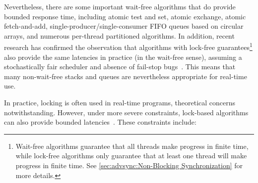 Nevertheless, there are some important wait-free algorithms that do
provide bounded response time, including atomic test and set,
atomic exchange,
atomic fetch-and-add,
single-producer/single-consumer FIFO queues based on circular arrays,
and numerous per-thread partitioned algorithms.
In addition, recent research has confirmed the observation that
algorithms with lock-free guarantees\footnote{
	Wait-free algorithms guarantee that all threads make progress in
	finite time, while lock-free algorithms only guarantee that at
	least one thread will make progress in finite time.
	See \cref{sec:advsync:Non-Blocking Synchronization} for more details.}
also provide the same latencies in practice (in the wait-free sense),
assuming a stochastically fair scheduler and absence of fail-stop
bugs~\cite{DanAlitarh2013PracticalProgress}.
This means that many non-wait-free stacks and queues are nevertheless
appropriate for real-time use.

\QuickQuizEnd

In practice, locking is often used in real-time programs, theoretical
concerns notwithstanding.
However, under more severe constraints, lock-based
algorithms can also provide bounded latencies~\cite{BjoernBrandenburgPhD}.
These constraints include:

